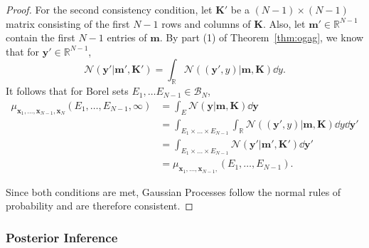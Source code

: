 \begin{proof}
    For the second consistency condition, let $\mathbf{K}'$ be a $(N - 1) \times (N - 1)$
    matrix consisting of the first $N - 1$ rows and columns of $\mathbf{K}$.
    Also, let $\mathbf{m}' \in \mathbb{R}^{N - 1}$ contain the first $N - 1$ entries of $\mathbf{m}$.
    By part (1) of Theorem~\ref{thm:ogag}, we know that for $\mathbf{y}' \in \mathbb{R}^{N - 1}$,
    \begin{equation*}
        \mathcal{N}(\mathbf{y}' | \mathbf{m}', \mathbf{K}')
        = \int_{\mathbb{R}} \mathcal{N}((\mathbf{y}', y) | \mathbf{m}, \mathbf{K}) \dd y.
    \end{equation*}
    It follows that for Borel sets $E_1, \ldots E_{N - 1} \in \mathcal{B}_N$,
    \begin{align*}
        \mu_{\mathbf{x}_1, \ldots, \mathbf{x}_{N - 1}, \mathbf{x}_N}(E_1, \ldots, E_{N - 1}, \infty)
        &= \int_{E} \mathcal{N}( \mathbf{y} | \mathbf{m}, \mathbf{K}) \dd \mathbf{y} \\
        &= \int_{E_1 \times \ldots \times E_{N - 1}}
        \int_{\mathbb{R}}
        \mathcal{N}( (\mathbf{y}', y) | \mathbf{m}, \mathbf{K})
        \dd y
        \dd \mathbf{y}' \\
        &= \int_{E_1 \times \ldots \times E_{N - 1}}
        \mathcal{N}( \mathbf{y}' | \mathbf{m}', \mathbf{K}')
        \dd \mathbf{y}' \\
        &= \mu_{\mathbf{x}_1, \ldots, \mathbf{x}_{N - 1}, }(E_1, \ldots, E_{N - 1}). 
    \end{align*}
    
    Since both conditions are met, Gaussian Processes follow the normal rules of probability and are therefore consistent.
\end{proof}

\subsubsection{Posterior Inference}\label{sssec:post-inf}

